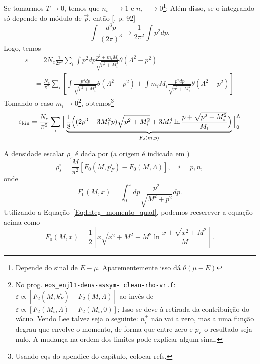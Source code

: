 Se tomarmos $T \to 0$, temos que $n_{i-} \to 1$ e $n_{i+} \to 0$\footnote{Depende do sinal de $E - \mu$. Aparementemente isso dá $\theta(\mu-E)$}; Além disso, se o integrando só depende do módulo de $\vec{p}$, então [\parencite{Glendenning}, p. 92]
\begin{equation}\label{Eq:Int_d3p_to_dp}
	\int\frac{d^3p}{(2\pi)^3} \to \frac{1}{2\pi^2}\int p^2dp.
\end{equation}
%
Logo, temos
\begin{align}
	\varepsilon &= 2 N_c \frac{1}{2\pi^2}\sum_i \int p^2 dp \frac{p^2 + m_i M_i}{\sqrt{p^2 + M_i^2}} \theta(\Lambda^2 - p^2) \\
	&= \frac{N_c}{\pi^2}\sum_i\left[\int \frac{p^4dp}{\sqrt{p^2 + M_i^2}}\theta(\Lambda^2 - p^2) + \int m_i M_i \frac{p^2 dp}{\sqrt{p^2 + M_i^2}}\theta(\Lambda^2 - p^2)\right] \label{Eq:Engergia_cin_separada}
\end{align}
%
Tomando o caso $m_i \to 0$\footnote{No prog. \texttt{eos\_enjl1-dens-assym- clean-rho-vr.f}: $\varepsilon \propto [F_2(M, k_F^i) - F_2(M, \Lambda)]$ ao invés de $\varepsilon \propto [F_2(M_i, \Lambda) - F_2(M_i, 0)]$; Isso se deve à retirada da contribuição do vácuo. Vendo Lee \etal talvez seja o seguinte: $n_i^+$ não vai a zero, mas a uma função degrau que envolve o momento, de forma que entre zero e $p_F$ o resultado seja nulo. A mudança na ordem dos limites pode explicar algum sinal.}, obtemos\footnote{Usando eqs do apendice do capítulo, colocar refs.}
\begin{equation}\label{Eq:Energia_kin}
	\varepsilon_{\rm{kin}} = \frac{N_c}{\pi^2}\sum_i \Big[\underbrace{\frac{1}{8}\Big((2p^3 - 3M_i^2p)\sqrt{p^2 + M_i^2} + 3M_i^4\ln\frac{p + \sqrt{p^2 + M_i^2}}{M_i}\Big)}_{F_2(m,p)}\Big]_0^\Lambda
\end{equation}

A densidade escalar $\rho_s$ é dada por (a origem é indicada em \textcite{japoneses})
\begin{equation}\label{Eq:Dens_Escalar}
	\rho_s^i = \frac{M}{\pi^2}[F_0(M, p_F^i) - F_0(M, \Lambda)], \quad i = p, n,
\end{equation}
%
onde
\begin{equation}\label{Eq:Def_F0}
	F_0(M, x) = \int_0^x dp\frac{p^2}{\sqrt{M^2 + p^2}} dp.
\end{equation}
%
Utilizando a Equação~\eqref{Eq:Integ_momento_quad}, podemos reescrever a equação acima como
\begin{equation}\label{Eq:Def_F0_integrado}
	F_0(M, x) = \frac{1}{2}\left[x\sqrt{x^2+M^2} - M^2 \ln \frac{x + \sqrt{x^2+M^2}}{M}\right].
\end{equation}

